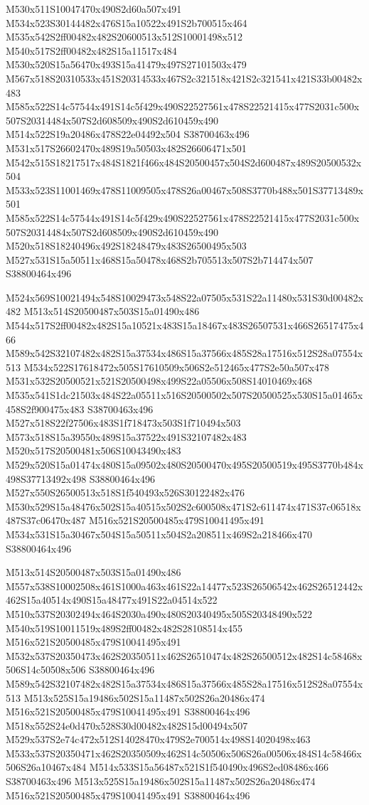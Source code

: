 \documentclass{article}
\begin{document}
\begin{multicols}{2}
M530x511S10047470x490S2d60a507x491 M534x523S30144482x476S15a10522x491S2b700515x464 M535x542S2ff00482x482S20600513x512S10001498x512 M540x517S2ff00482x482S15a11517x484 M530x520S15a56470x493S15a41479x497S27101503x479 M567x518S20310533x451S20314533x467S2c321518x421S2c321541x421S33b00482x483 M585x522S14c57544x491S14c5f429x490S22527561x478S22521415x477S2031c500x507S20314484x507S2d608509x490S2d610459x490 M514x522S19a20486x478S22e04492x504 S38700463x496 M531x517S26602470x489S19a50503x482S26606471x501 M542x515S18217517x484S1821f466x484S20500457x504S2d600487x489S20500532x504 M533x523S11001469x478S11009505x478S26a00467x508S3770b488x501S37713489x501 M585x522S14c57544x491S14c5f429x490S22527561x478S22521415x477S2031c500x507S20314484x507S2d608509x490S2d610459x490 M520x518S18240496x492S18248479x483S26500495x503 M527x531S15a50511x468S15a50478x468S2b705513x507S2b714474x507 S38800464x496

M524x569S10021494x548S10029473x548S22a07505x531S22a11480x531S30d00482x482 M513x514S20500487x503S15a01490x486 M544x517S2ff00482x482S15a10521x483S15a18467x483S26507531x466S26517475x466 M589x542S32107482x482S15a37534x486S15a37566x485S28a17516x512S28a07554x513 M534x522S17618472x505S17610509x506S2e512465x477S2e50a507x478 M531x532S20500521x521S20500498x499S22a05506x508S14010469x468 M535x541S1dc21503x484S22a05511x516S20500502x507S20500525x530S15a01465x458S2f900475x483 S38700463x496 M527x518S22f27506x483S1f718473x503S1f710494x503 M573x518S15a39550x489S15a37522x491S32107482x483 M520x517S20500481x506S10043490x483 M529x520S15a01474x480S15a09502x480S20500470x495S20500519x495S3770b484x498S37713492x498 S38800464x496 M527x550S26500513x518S1f540493x526S30122482x476 M530x529S15a48476x502S15a40515x502S2c600508x471S2c611474x471S37c06518x487S37c06470x487 M516x521S20500485x479S10041495x491 M534x531S15a30467x504S15a50511x504S2a208511x469S2a218466x470 S38800464x496

M513x514S20500487x503S15a01490x486 M557x538S10002508x461S1000a463x461S22a14477x523S26506542x462S26512442x462S15a40514x490S15a48477x491S22a04514x522 M510x537S20302494x464S2030a490x480S20340495x505S20348490x522 M540x519S10011519x489S2ff00482x482S28108514x455 M516x521S20500485x479S10041495x491 M532x537S20350473x462S20350511x462S26510474x482S26500512x482S14c58468x506S14c50508x506 S38800464x496 M589x542S32107482x482S15a37534x486S15a37566x485S28a17516x512S28a07554x513 M513x525S15a19486x502S15a11487x502S26a20486x474 M516x521S20500485x479S10041495x491 S38800464x496 M518x552S24e0d470x528S30d00482x482S15d00494x507 M529x537S2e74c472x512S14028470x479S2e700514x498S14020498x463 M533x537S20350471x462S20350509x462S14c50506x506S26a00506x484S14c58466x506S26a10467x484 M514x533S15a56487x521S1f540490x496S2ed08486x466 S38700463x496 M513x525S15a19486x502S15a11487x502S26a20486x474 M516x521S20500485x479S10041495x491 S38800464x496


\end{multicols}
\end{document}
